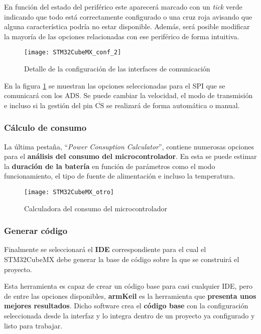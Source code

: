 En función del estado del periférico este aparecerá marcado con un \textit{tick} verde indicando que todo está correctamente configurado o una cruz roja avisando que alguna característica podría no estar disponible. Además, será posible modificar la mayoría de las opciones relacionadas con ese periférico de forma intuitiva. 

\begin{figure} [h]
    \centering
    \texttt{[image: STM32CubeMX\_conf\_2]}
    \caption{Detalle de la configuración de las interfaces de comunicación}
    \label{fig:STM32CubeMX_conf_2}
\end{figure}

En la figura \ref{fig:STM32CubeMX_conf_2} se muestran las opciones seleccionadas para el SPI que se comunicará con los ADS. Se puede cambiar la velocidad, el modo de transmisión e incluso si la gestión del pin $\overline{\text{CS}}$ se realizará de forma automática o manual.

\subsubsection{Cálculo de consumo\label{sec:Configuracion_micro_consumo}}

La última pestaña, ``\textit{Power Consuption Calculator}'', contiene numerosas opciones para el \textbf{análisis del consumo del microcontrolador}. En esta se puede estimar la \textbf{duración de la batería} en función de parámetros como el modo funcionamiento, el tipo de fuente de alimentación e incluso la temperatura.

\begin{figure} [h]
    \centering
    \texttt{[image: STM32CubeMX\_otro]}
    \caption{Calculadora del consumo del microcontrolador}
    \label{fig:STM32CubeMX_otro}
\end{figure}

\subsubsection{Generar código\label{sec:Configuracion_micro_generador}}

Finalmente se seleccionará el \textbf{\acrshort{IDE}} correspondiente para el cual el STM32CubeMX debe generar la base de código sobre la que se construirá el proyecto.

Esta herramienta es capaz de crear un código base para casi cualquier \acrshort{IDE}, pero de entre las opciones disponibles, \textbf{armKeil} es la herramienta que \textbf{presenta unos mejores resultados}. Dicho software crea el \textbf{código base} con la configuración seleccionada desde la interfaz y lo integra dentro de un proyecto ya configurado y listo para trabajar.

